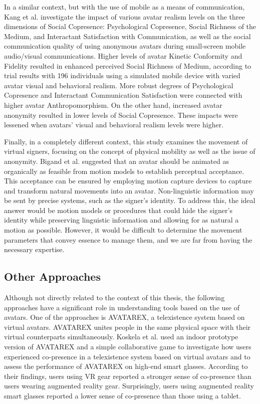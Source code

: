 In a similar context, but with the use of mobile as a means of communication, Kang et al. \cite{KAN13} investigate the impact of various avatar realism levels on the three dimensions of Social Copresence: Psychological Copresence, Social Richness of the Medium, and Interactant Satisfaction with Communication, as well as the social communication quality of using anonymous avatars during small-screen mobile audio/visual communications. Higher levels of avatar Kinetic Conformity and Fidelity resulted in enhanced perceived Social Richness of Medium, according to trial results with 196 individuals using a simulated mobile device with varied avatar visual and behavioral realism. More robust degrees of Psychological Copresence and Interactant Communication Satisfaction were connected with higher avatar Anthropomorphism. On the other hand, increased avatar anonymity resulted in lower levels of Social Copresence. These impacts were lessened when avatars' visual and behavioral realism levels were higher.

Finally, in a completely different context, this study examines the movement of virtual signers, focusing on the concept of physical mobility as well as the issue of anonymity. Bigand et al. \cite{BIG19} suggested that an avatar should be animated as organically as feasible from motion models to establish perceptual acceptance. This acceptance can be ensured by employing motion capture devices to capture and transform natural movements into an avatar. Non-linguistic information may be sent by precise systems, such as the signer's identity. To address this, the ideal answer would be motion models or procedures that could hide the signer's identity while preserving linguistic information and allowing for as natural a motion as possible. However, it would be difficult to determine the movement parameters that convey essence to manage them, and we are far from having the necessary expertise.

\subsection{Other Approaches}
Although not directly related to the context of this thesis, the following approaches have a significant role in understanding tools based on the use of avatars. One of the approaches is AVATAREX, a telexistence system based on virtual avatars. AVATAREX unites people in the same physical space with their virtual counterparts simultaneously. Koskela et al. \cite{KOS18} used an indoor prototype version of AVATAREX and a simple collaborative game to investigate how users experienced co-presence in a telexistence system based on virtual avatars and to assess the performance of AVATAREX on high-end smart glasses. According to their findings, users using VR gear reported a stronger sense of co-presence than users wearing augmented reality gear. Surprisingly, users using augmented reality smart glasses reported a lower sense of co-presence than those using a tablet.

